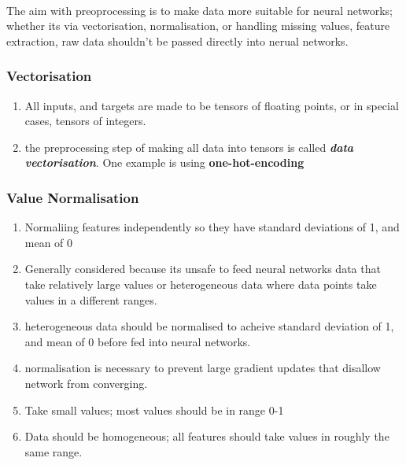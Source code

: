 \documentclass[12pt, a4paper]{article}
\begin{document}
\paragraph*{}
The aim with preoprocessing is to make data more suitable for neural networks;
whether its via vectorisation, normalisation, or handling missing values, feature
extraction, raw data shouldn't be passed directly into nerual networks.

\subsubsection{Vectorisation}
\begin{enumerate}
   \item All inputs, and targets are made to be tensors of floating points,
   or in special cases, tensors of integers. 
   \item the preprocessing step of making all data into tensors is called 
   \textbf{\textit{data vectorisation}}. One example is using \textbf{one-hot-encoding}
\end{enumerate}

\subsubsection{Value Normalisation}
\begin{enumerate}
   \item Normaliing features independently so they have standard deviations of 1, and mean of 0
   \item Generally considered because its unsafe to feed neural networks data that take 
   relatively large values or heterogeneous data where data points take values in a different ranges.
   \item heterogeneous data should be normalised to acheive standard deviation of 1, and mean of 0 before
   fed into neural networks.
   \item normalisation is necessary to prevent large gradient updates that disallow network from converging.
   \item  Take small values; most values should be in range 0-1
   \item Data should be homogeneous; all features should take values in roughly the same range.
\end{enumerate}
\end{document}
